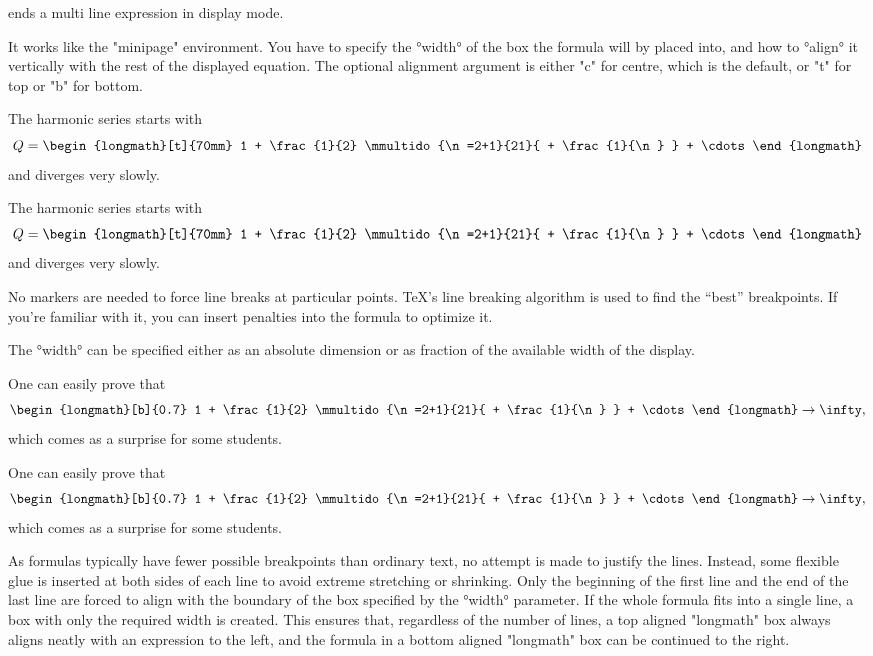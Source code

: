 \documentclass{longmath-doc}
\begin{document}
 ends a multi line expression in display mode. 

It works like the "minipage" environment. You have to specify the °width° of the box the formula will by placed into, and how to °align° it vertically with the rest of the displayed equation. The optional alignment argument is either "c" for centre, which is the default, or "t" for top or "b" for bottom. 
\begin{code*}
  \newcommand\harm[2]{ \frac{1}{#1} \mmultido{\n=#1+1}{#2}{ + \frac{1}{\n} } } 
\end{code*}
  \newcommand\harm[2]{ \frac{1}{#1} \mmultido{\n=#1+1}{#2}{ + \frac{1}{\n} } } 
\begin{code+}
  The harmonic series starts with 
  $$  Q = \begin{longmath}[t]{70mm}
          1 + \harm{2}{21} + \cdots           %
         \end{longmath} $$
  and diverges very slowly. 
\end{code+}
\begin{exec}
  The harmonic series starts with 
  $$  Q = \begin{longmath}[t]{70mm}
          1 + \harm{2}{21} + \cdots 
         \end{longmath} $$
  and diverges very slowly. 
\end{exec}
No markers are needed to force line breaks at particular points. \TeX's line breaking algorithm is used to find the ``best'' breakpoints. If you're familiar with it, you can insert penalties into the formula to optimize it. 

The °width° can be specified either as an absolute dimension or as fraction of the available width of the display.
\begin{code+}
  One can easily prove that  
  $$  \begin{longmath}[b]{0.7}
          1 + \harm{2}{21} + \cdots 
         \end{longmath} \to \infty, $$
  which comes as a surprise for some students. 
\end{code+}
\begin{exec}
  One can easily prove that  
  $$  \begin{longmath}[b]{0.7}
          1 + \harm{2}{21} + \cdots 
         \end{longmath} \to \infty, $$
  which comes as a surprise for some students. 
\end{exec}
As formulas typically have fewer possible breakpoints than ordinary text, no attempt is made to justify the lines. Instead, some flexible glue is inserted at both sides of each line to avoid extreme stretching or shrinking. Only the beginning of the first line and the end of the last line are forced to align with the boundary of the box specified by the °width° parameter. If the whole formula fits into a single line, a box with only the required width is created. This ensures that, regardless of the number of lines, a top aligned "longmath" box always aligns neatly with an expression to the left, and the formula in a bottom aligned "longmath" box can be continued to the right. 
\end{document}
